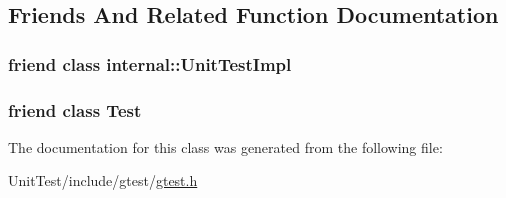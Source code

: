 \subsection{Friends And Related Function Documentation}
\hypertarget{classtesting_1_1_test_case_acc0a5e7573fd6ae7ad1878613bb86853}{
\subsubsection[{internal\+::\+Unit\+Test\+Impl}]{\setlength{\rightskip}{0pt plus 5cm}friend class internal\+::\+Unit\+Test\+Impl\hspace{0.3cm}{\ttfamily [friend]}}}\label{classtesting_1_1_test_case_acc0a5e7573fd6ae7ad1878613bb86853}
\hypertarget{classtesting_1_1_test_case_a5b78b1c2e1fa07ffed92da365593eaa4}{
\subsubsection[{Test}]{\setlength{\rightskip}{0pt plus 5cm}friend class {\bf Test}\hspace{0.3cm}{\ttfamily [friend]}}}\label{classtesting_1_1_test_case_a5b78b1c2e1fa07ffed92da365593eaa4}


The documentation for this class was generated from the following file\+:\begin{DoxyCompactItemize}
\item 
Unit\+Test/include/gtest/\hyperlink{gtest_8h}{gtest.\+h}\end{DoxyCompactItemize}
